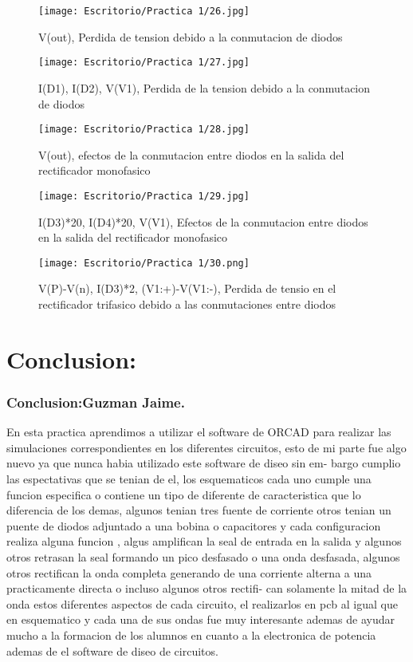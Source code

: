 \documentclass[11pt,a4paper]{article}
\begin{document}
\begin{figure}[hbtp]
\centering
\texttt{[image: Escritorio/Practica 1/26.jpg]}
\caption{V(out), Perdida de tension debido a la conmutacion de diodos}
\end{figure}

\begin{figure}[hbtp]
\centering
\texttt{[image: Escritorio/Practica 1/27.jpg]}
\caption{I(D1), I(D2), V(V1), Perdida de la tension debido a la conmutacion de diodos}
\end{figure}

\begin{figure}[hbtp]
\centering
\texttt{[image: Escritorio/Practica 1/28.jpg]}
\caption{V(out), efectos de la conmutacion entre diodos en la salida del rectificador monofasico}
\end{figure}

\begin{figure}[hbtp]
\centering
\texttt{[image: Escritorio/Practica 1/29.jpg]}
\caption{I(D3)*20, I(D4)*20, V(V1), Efectos de la conmutacion entre diodos en la salida del rectificador monofasico}
\end{figure}

\begin{figure}[hbtp]
\centering
\texttt{[image: Escritorio/Practica 1/30.png]}
\caption{V(P)-V(n), I(D3)*2, (V1:+)-V(V1:-), Perdida de tensio en el rectificador trifasico debido a las conmutaciones entre diodos}
\end{figure}

\section{Conclusion:}
\subsubsection{Conclusion:Guzman Jaime.}
En esta practica aprendimos a utilizar el software de ORCAD para realizar
las simulaciones correspondientes en los diferentes circuitos, esto de mi parte
fue algo nuevo ya que nunca habia utilizado este software de diseo sin em-
bargo cumplio las espectativas que se tenian de el, los esquematicos cada uno
cumple una funcion especifica o contiene un tipo de diferente de caracteristica
que lo diferencia de los demas, algunos tenian tres fuente de corriente otros
tenian un puente de diodos adjuntado a una bobina o capacitores y cada
configuracion realiza alguna funcion , algus amplifican la seal de entrada en
la salida y algunos otros retrasan la seal formando un pico desfasado o una
onda desfasada, algunos otros rectifican la onda completa generando de una
corriente alterna a una practicamente directa o incluso algunos otros rectifi-
can solamente la mitad de la onda estos diferentes aspectos de cada circuito,
el realizarlos en pcb al igual que en esquematico y cada una de sus ondas
fue muy interesante ademas de ayudar mucho a la formacion de los alumnos
en cuanto a la electronica de potencia ademas de el software de diseo de
circuitos.\\
\end{document}
